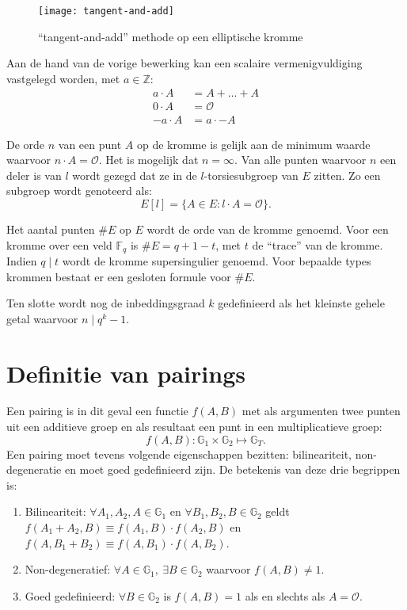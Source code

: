 \begin{figure}[h]
	\centering
		\texttt{[image: tangent-and-add]}
		\caption{``tangent-and-add'' methode op een elliptische kromme\label{figuur-pairings-tangent-and-chord}}
\end{figure}

Aan de hand van de vorige bewerking kan een scalaire vermenigvuldiging vastgelegd worden, met $a \in \mathbb{Z}$:
\[\begin{aligned}
a \cdot A	&= A + \ldots + A\\
0 \cdot A	&= \mathcal{O}\\
-a \cdot A	&= a \cdot -A
\end{aligned}\]

De orde $n$ van een punt $A$ op de kromme is gelijk aan de minimum waarde waarvoor $n \cdot A = \mathcal{O}$. Het is mogelijk dat $n = \infty$. Van alle punten waarvoor $n$ een deler is van $l$ wordt gezegd dat ze in de $l$-torsiesubgroep van $E$ zitten. Zo een subgroep wordt genoteerd als:
\[E[l] = \{ A \in E : l \cdot A = \mathcal{O} \}.\]

Het aantal punten $\#E$ op $E$ wordt de orde van de kromme genoemd. Voor een kromme over een veld $\mathbb{F}_q$ is $\#E = q + 1 - t$, met $t$ de ``trace'' van de kromme. Indien $q \mid t$ wordt de kromme supersingulier genoemd. Voor bepaalde types krommen bestaat er een gesloten formule voor $\#E$.

Ten slotte wordt nog de inbeddingsgraad $k$ gedefinieerd als het kleinste gehele getal waarvoor $n \mid q^k - 1$.

\section{Definitie van pairings}

Een pairing is in dit geval een functie $f(A, B)$ met als argumenten twee punten uit een additieve groep en als resultaat een punt in een multiplicatieve groep:
\[f(A, B): \mathbb{G}_1 \times \mathbb{G}_2 \mapsto \mathbb{G}_T.\]
Een pairing moet tevens volgende eigenschappen bezitten: bilineariteit, non-degeneratie en moet goed gedefinieerd zijn. De betekenis van deze drie begrippen is:

\begin{enumerate}
	\item Bilineariteit: $\forall A_1, A_2, A \in \mathbb{G}_1$ en $\forall B_1, B_2, B \in \mathbb{G}_2$ geldt $f(A_1 + A_2, B) \equiv f(A_1, B) \cdot f(A_2, B)$ en $f(A, B_1 + B_2) \equiv f(A, B_1) \cdot f(A, B_2)$.

	\item Non-degeneratief: $\forall A \in \mathbb{G}_1, \: \exists B \in \mathbb{G}_2$ waarvoor $f(A, B) \neq 1$.

	\item Goed gedefinieerd: $\forall B \in \mathbb{G}_2$ is $f(A, B) = 1$ als en slechts als $A = \mathcal{O}$.
\end{enumerate}

